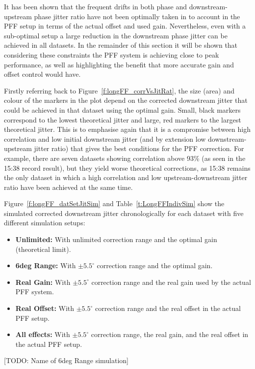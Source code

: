 It has been shown that the frequent drifts in both phase and downstream-upstream phase jitter ratio have not been optimally taken in to account in the PFF setup in terms of the actual offset and used gain. Nevertheless, even with a sub-optimal setup a large reduction in the downstream phase jitter can be achieved in all datasets. In the remainder of this section it will be shown that considering these constraints the PFF system is achieving close to peak performance, as well as highlighting the benefit that more accurate gain and offset control would have.

Firstly referring back to Figure~\ref{f:longFF_corrVsJitRat}, the size (area) and colour of the markers in the plot depend on the corrected downstream jitter that could be achieved in that dataset using the optimal gain. Small, black markers correspond to the lowest theoretical jitter and large, red markers to the largest theoretical jitter. This is to emphasise again that it is a compromise between high correlation and low initial downstream jitter (and by extension low downstream-upstream jitter ratio) that gives the best conditions for the PFF correction. For example, there are seven datasets showing correlation above 93\% (as seen in the 15:38 record result), but they yield worse theoretical corrections, as 15:38 remains the only dataset in which a high correlation and low upstream-downstream jitter ratio have been achieved at the same time.

Figure~\ref{f:longFF_datSetJitSim} and Table~\ref{t:LongFFIndivSim} show the simulated corrected downstream jitter chronologically for each dataset with five different simulation setups:
\begin{itemize}
\item \textbf{Unlimited:} With unlimited correction range and the optimal gain (theoretical limit).
\item \textbf{6deg Range:} With \(\pm5.5^\circ\) correction range and the optimal gain.
\item \textbf{Real Gain:} With \(\pm5.5^\circ\) correction range and the real gain used by the actual PFF system.
\item \textbf{Real Offset:} With \(\pm5.5^\circ\) correction range and the real offset in the actual PFF setup.
\item \textbf{All effects:} With \(\pm5.5^\circ\) correction range, the real gain, and the real offset in the actual PFF setup.
\end{itemize}

[TODO: Name of 6deg Range simulation]

